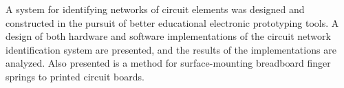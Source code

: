 % 
% 
%


A system for identifying networks of circuit elements was designed and constructed in the pursuit of better educational electronic prototyping tools.
A design of both hardware and software implementations of the circuit network identification system are presented, and the results of the implementations are analyzed.
Also presented is a method for surface-mounting breadboard finger springs to printed circuit boards.



